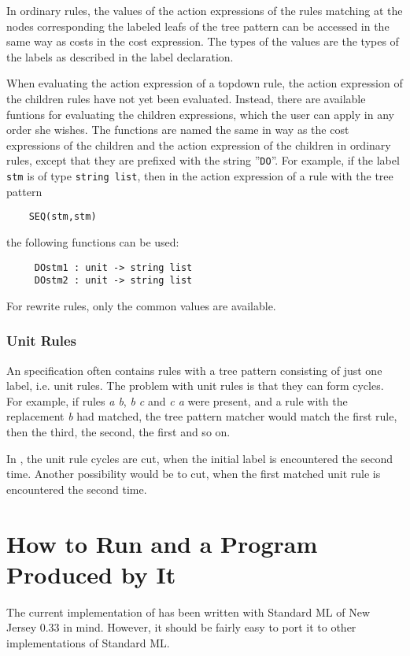 In ordinary rules, the values of the action expressions of
the rules matching at the nodes corresponding the labeled leafs of
the tree pattern can be accessed in the same way as costs in the
cost expression. The types of the values are the types of the labels
as described in the label declaration.

When evaluating the action expression of a topdown rule, the action
expression of the children rules have not yet been evaluated. Instead,
there are available funtions for evaluating the children expressions,
which the user can apply in any order she wishes. The functions are
named the same in way as the cost expressions of the children and the
action expression of the children in ordinary rules, except that they
are prefixed with the string ''{\tt DO}''. For example, if the
label {\tt stm} is of type {\tt string list}, then in the action
expression of a rule with the tree pattern
\begin{verbatim}
    SEQ(stm,stm)
\end{verbatim}
the following functions can be used:
\begin{verbatim}
     DOstm1 : unit -> string list
     DOstm2 : unit -> string list
\end{verbatim}
For rewrite rules, only the common values are available.

\subsubsection{Unit Rules}
An \mltwig specification often contains rules with a tree pattern
consisting of just one label, i.e. unit rules. The problem with
unit rules is that they can form cycles. For example, if rules {\em a b},
{\em b c} and {\em c a} were present, and a rule with the replacement
{\em b} had matched, the tree pattern matcher would match the first
rule, then the third, the second, the first and so on.

In \mltwig, the unit rule cycles are cut, when the initial label is
encountered the second time. Another possibility would be to cut, when
the first matched unit rule is encountered the second time.

\section{How to Run \mltwig and a Program Produced by It}
The current implementation of \mltwig has been written with
Standard ML of New Jersey 0.33 in mind. However, it should
be fairly easy to port it to other implementations of Standard ML.

